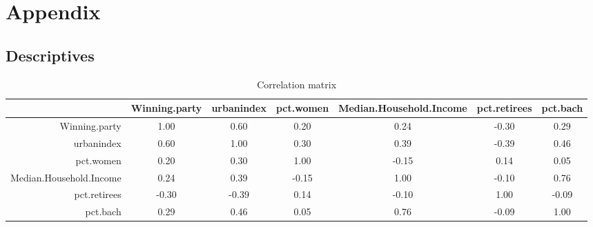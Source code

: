\documentclass[12pt]{article}
\begin{document}
\newpage
\appendix
\setcounter{table}{0}
\renewcommand{\thetable}{A\arabic{table}}
\setcounter{figure}{0}
\renewcommand{\thefigure}{A\arabic{figure}}

\section*{Appendix}


\subsection*{Descriptives}

\begin{table}[h]
	\centering
	\begin{adjustbox}{max width=\textwidth}
	\begin{tabular}{rcccccc}
		\hline
		& Winning.party & urbanindex & pct.women & Median.Household.Income & pct.retirees & pct.bach \\ 
		\hline
		Winning.party & 1.00 & 0.60 & 0.20 & 0.24 & -0.30 & 0.29 \\ 
		urbanindex & 0.60 & 1.00 & 0.30 & 0.39 & -0.39 & 0.46 \\ 
		pct.women & 0.20 & 0.30 & 1.00 & -0.15 & 0.14 & 0.05 \\ 
		Median.Household.Income & 0.24 & 0.39 & -0.15 & 1.00 & -0.10 & 0.76 \\ 
		pct.retirees & -0.30 & -0.39 & 0.14 & -0.10 & 1.00 & -0.09 \\ 
		pct.bach & 0.29 & 0.46 & 0.05 & 0.76 & -0.09 & 1.00 \\ 
		\hline
	\end{tabular}
	\end{adjustbox}
	\caption{Correlation matrix}
	\label{}
\end{table}

\end{document}
